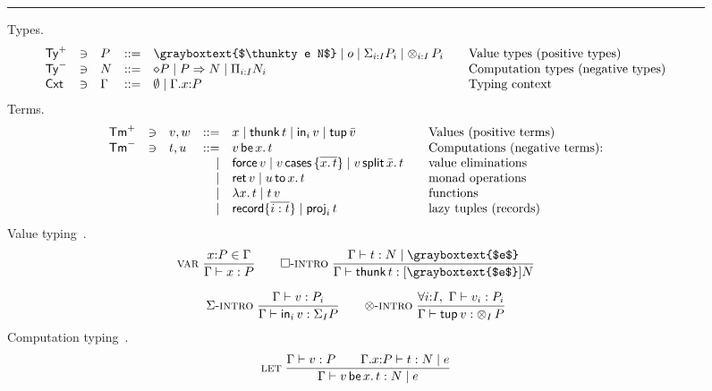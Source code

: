 \documentclass[acmsmall,review,anonymous]{acmart}\settopmatter{printfolios=true,printccs=false,printacmref=false}
\newcommand{\dashruler}{\hdashrule[0.5ex]{\textwidth}{0.2pt}{1ex}}
\newcommand{\ruler}{\rule{\textwidth}{0.2pt}}
\newcommand{\graybox}[1]{\grayboxtext{$#1$}}
\theoremstyle{remark}
\begin{document}
\begin{figure}[htbp]
\flushleft
\ruler{}
Types.
\[
\begin{array}{lllrl@{\qquad}l}
\PTy & \ni & P
  & ::= & \graybox{\thunkty e N}
     \mid o \mid \sumty i I P \mid \tupty i I P
  & \mbox{Value types (positive types)} \\
\NTy & \ni & N
  & ::= & \diamond P
     \mid P \To N \mid \recty i I N
  & \mbox{Computation types (negative types)} \\
\Cxt & \ni & \Gamma
  & ::= & \cempty \mid \ext \Gamma x P
  & \mbox{Typing context}
\\
\end{array}
\]
\dashruler{}
Terms.
\[
\begin{array}{lllrl@{\qquad}l}
\PTm & \ni & v,w
  & ::= & x
     \mid \thunk t
     \mid \inj i v
     \mid \ptup{\bar v}
  & \mbox{Values (positive terms)} \\
\NTm & \ni & t,u
  & ::= &
         \vlet x v t
  & \mbox{Computations (negative terms):}
\\ &&& \mid &
        \force v
    \mid \case v {\overline{x.\,t}}
    \mid \splits v {\bar x} t
  & \mbox{value eliminations}
\\ &&& \mid &
         \ret v        \mid \bind x u t
  & \mbox{monad operations}
\\ &&& \mid &
         \lam x t      \mid \app t v
  & \mbox{functions}
\\ &&& \mid &
         \trecord\{\overline{i:t}\} %
       \mid \proj i t
  & \mbox{lazy tuples (records)}
\end{array}
\]
\dashruler{}
Value typing \,.
\begin{gather*}
 \nru{\rvar}
     {x{:}P \in \Gamma
    }{\ValTy \Gamma x P}
\qquad
 \nru{\rintro\Box}
     {\CompTy \Gamma t {\graybox e} N
    }{\ValTy \Gamma {\thunk t} {\thunkty {\graybox e} N}}
\\[1.5ex]
 \nru{\rintro\GS}
     {\ValTy \Gamma v {P_i}
    }{\ValTy \Gamma {\inj i v} {\sumt I P}}
\qquad
 \nru{\rintro\otimes}
     {\forall i{:}I, \ \ValTy \Gamma {v_i} {P_i}
    }{\ValTy \Gamma {\ptup v} {\tupt I P}}
\end{gather*}
\dashruler{}
Computation typing \fbox{$\CompTy \Gamma t {\graybox{e}} N$}\,.
\begin{gather*}
 \nru{\rlet}
     {\ValTy \Gamma v P \qquad
      \CompTy {\ext \Gamma x P} t e N
    }{\CompTy \Gamma {\vlet x v t} e N}

\end{gather*}
\end{figure}
\end{document}
